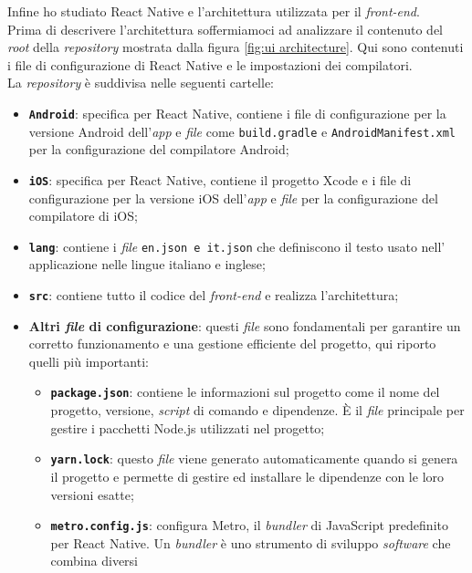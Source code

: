 Infine ho studiato React Native e l'architettura utilizzata per il \textit{front-end}.\\
Prima di descrivere l'architettura soffermiamoci ad analizzare il contenuto del \textit{root} della \textit{repository} 
mostrata dalla figura \ref{fig:ui architecture}.
Qui sono contenuti i file di configurazione di React Native e le impostazioni dei compilatori.\\
La \textit{repository} è suddivisa nelle seguenti cartelle:
\begin{itemize}
    \item \texttt{\textbf{Android}}: specifica per React Native, contiene i file di configurazione 
          per la versione Android dell'\textit{app} e \textit{file} come \texttt{build.gradle} e \texttt{AndroidManifest.xml} 
          per la configurazione del compilatore Android;
    \item \texttt{\textbf{iOS}}: specifica per React Native, contiene il progetto Xcode e i file di configurazione 
          per la versione iOS dell'\textit{app} e \textit{file} per la configurazione del compilatore di iOS;
    \item \texttt{\textbf{lang}}: contiene i \textit{file} \texttt{en.json e it.json} che definiscono il testo usato nell'
          applicazione nelle lingue italiano e inglese;
    \item \texttt{\textbf{src}}: contiene tutto il codice del \textit{front-end} e realizza l'architettura;
    \item \textbf{Altri \textit{file} di configurazione}: questi \textit{file} sono fondamentali 
          per garantire un corretto funzionamento e una gestione efficiente del progetto, qui riporto quelli più importanti:
          \begin{itemize}
            \item \textbf{\texttt{package.json}}: contiene le informazioni sul progetto come il nome del progetto, versione,
                  \textit{script} di comando e dipendenze. È il \textit{file} principale per gestire i pacchetti Node.js utilizzati nel progetto;
            \item \textbf{\texttt{yarn.lock}}: questo \textit{file} viene generato automaticamente quando si genera il progetto e 
                  permette di gestire ed installare le dipendenze con le loro versioni esatte;
            \item \textbf{\texttt{metro.config.js}}: configura Metro, il \textit{bundler} di JavaScript predefinito 
                  per React Native. Un \textit{bundler} è uno strumento di sviluppo \textit{software} che combina diversi 

\end{itemize}
\end{itemize}
